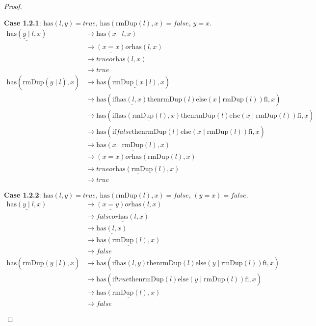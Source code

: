\documentclass[12pt, a4paper]{article}
\newcommand{\rel}[1]{\mathrel{#1}}
\newcommand{\rmx}[1]{\mathrm{#1}}
\newcommand{\larrow}{\longrightarrow}
\newcommand{\under}{\underline}
\begin{document}
\begin{proof}
\begin{description}
\textbf{Case 1.2.1}: $\rmx{has}(l, y) = true$, $\rmx{has}(\rmx{rmDup}(l), x) = false$, $y = x$.
\begin{align*}
\under{\rmx{has}(\under{y} \mid l, x)}
	&\larrow \under{\rmx{has}(x \mid l, x)} \tag{case splitting} \\
	&\larrow \under{(x = x)} \rel{or} \rmx{has}(l, x) \tag{by has2} \\
	&\larrow \under{true \rel{or} \rmx{has}(l, x)} \tag{by equality} \\
	&\larrow true \tag{by or} \\
\rmx{has}(\under{\rmx{rmDup}(\under{y} \mid l)}, x)
	&\larrow \rmx{has}(\under{\rmx{rmDup}(x \mid l)}, x) \tag{by case splitting} \\
	&\larrow \rmx{has}(\rel{\rmx{if}} \under{\rmx{has}(l, x)} \rel{\rmx{then}} \rmx{rmDup}(l) \rel{\rmx{else}} (x \mid \rmx{rmDup}(l)) \rel{\rmx{fi}}, x) \tag{by rmDup2} \\
	&\larrow \rmx{has}(\rel{\rmx{if}} \under{\rmx{has}(\rmx{rmDup}(l), x)} \rel{\rmx{then}} \rmx{rmDup}(l) \rel{\rmx{else}} (x \mid \rmx{rmDup}(l)) \rel{\rmx{fi}}, x) \tag{by IH} \\
	&\larrow \rmx{has}(\under{\rel{\rmx{if}} false \rel{\rmx{then}} \rmx{rmDup}(l) \rel{\rmx{else}} (x \mid \rmx{rmDup}(l)) \rel{\rmx{fi}}}, x) \tag{by case splitting} \\
	&\larrow \under{\rmx{has}(x \mid \rmx{rmDup}(l), x)} \tag{by if2} \\
	&\larrow \under{(x = x)} \rel{or} \rmx{has}(\rmx{rmDup}(l), x) \tag{by has2} \\
	&\larrow \under{true \rel{or} \rmx{has}(\rmx{rmDup}(l), x)} \tag{by equality} \\
	&\larrow true \tag{by or}
\end{align*}

\textbf{Case 1.2.2}: $\rmx{has}(l, y) = true$, $\rmx{has}(\rmx{rmDup}(l), x) = false$, $(y = x) = false$.
\begin{align*}
\under{\rmx{has}(y \mid l, x)}
	&\larrow \under{(x = y)} \rel{or} \rmx{has}(l, x) \tag{by has2} \\
	&\larrow \under{false \rel{or} \rmx{has}(l, x)} \tag{by case splitting} \\
	&\larrow \under{\rmx{has}(l, x)} \tag{by or} \\
	&\larrow \under{\rmx{has}(\rmx{rmDup}(l), x)} \tag{by IH} \\
	&\larrow false \tag{by case splitting} \\
\rmx{has}(\under{\rmx{rmDup}(y \mid l)}, x)
	&\larrow \rmx{has}(\rel{\rmx{if}} \under{\rmx{has}(l, y)} \rel{\rmx{then}} \rmx{rmDup}(l) \rel{\rmx{else}} (y \mid \rmx{rmDup}(l)) \rel{\rmx{fi}}, x) \tag{by rmDup2} \\
	&\larrow \rmx{has}(\under{\rel{\rmx{if}} true \rel{\rmx{then}} \rmx{rmDup}(l) \rel{\rmx{else}} (y \mid \rmx{rmDup}(l)) \rel{\rmx{fi}}}, x) \tag{by case splitting} \\
	&\larrow \under{\rmx{has}(\rmx{rmDup}(l), x)} \tag{by if1} \\
	&\larrow false \tag{by case splitting}
\end{align*}


\end{description}
\end{proof}
\end{document}
